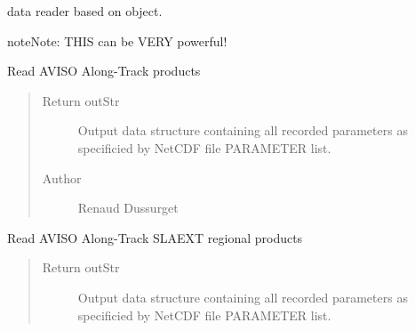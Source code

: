 \documentclass[letterpaper,10pt,english]{sphinxmanual}
\begin{document}
\begin{fulllineitems}

\begin{fulllineitems}
\label{altimetry.data:altimetry.data.alti_data.read_nc}
data reader based on {\hyperref[altimetry.tools.nctools:altimetry.tools.nctools.nc]{\emph{}}} object.

\begin{notice}{note}{Note:}
THIS can be VERY powerful!
\end{notice}

\end{fulllineitems}


\begin{fulllineitems}
\label{altimetry.data:altimetry.data.alti_data.read_sla}
Read AVISO Along-Track products
\begin{quote}\begin{description}
\item[{Return outStr}] \leavevmode
Output data structure containing all recorded parameters as specificied by NetCDF file PARAMETER list.

\item[{Author}] \leavevmode
Renaud Dussurget

\end{description}\end{quote}

\end{fulllineitems}


\begin{fulllineitems}
\label{altimetry.data:altimetry.data.alti_data.read_slaext}
Read AVISO Along-Track SLAEXT regional products
\begin{quote}\begin{description}
\item[{Return outStr}] \leavevmode
Output data structure containing all recorded parameters as specificied by NetCDF file PARAMETER list.


\end{description}
\end{quote}
\end{fulllineitems}
\end{fulllineitems}
\end{document}
